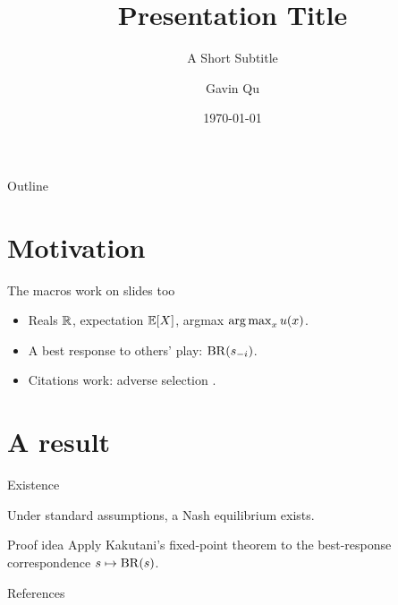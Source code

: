 \documentclass[11pt,aspectratio=169]{beamer}
\title{Presentation Title}
\subtitle{A Short Subtitle}
\author{Gavin Qu}
\institute{Department of Economics}
\date{\today}
\begin{document}
\maketitle

\begin{frame}{Outline}
  \tableofcontents
\end{frame}

\section{Motivation}

\begin{frame}{The macros work on slides too}
  \begin{itemize}
    \item Reals \(\mathbb{R}\), expectation \(\mathbb{E}[X]\), argmax \(\operatorname*{arg\,max}_{x} u(x)\).
    \item A best response to others' play: \(\operatorname{BR}(s_{{-i}})\).
    \item Citations work: adverse selection \parencite{akerlof1970}.
  \end{itemize}
\end{frame}

\section{A result}

\begin{frame}{Existence}
  \begin{theorem}
    Under standard assumptions, a Nash equilibrium exists.
  \end{theorem}
  \begin{block}{Proof idea}
    Apply Kakutani's fixed-point theorem to the best-response correspondence
    \(s \mapsto \operatorname{BR}(s)\).
  \end{block}
\end{frame}

\appendix
\begin{frame}[allowframebreaks]{References}
  \printrefs
\end{frame}
\end{document}
